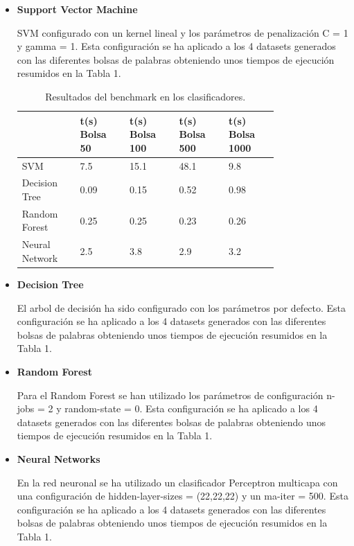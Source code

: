 \documentclass[11pt,a4paper]{article}
\begin{document}
\begin{itemize}
	\item \textbf{ Support Vector Machine }
    
    SVM configurado con un kernel lineal y los parámetros de penalización C = 1 y gamma = 1. Esta configuración se ha aplicado a los 4 datasets generados con las diferentes bolsas de palabras obteniendo unos tiempos de ejecución resumidos en la Tabla 1.
    
    \begin{table}[h]
      \label{tabla_benchmark}
      \caption{Resultados del benchmark en los clasificadores.}
      \centering
      \begin{tabular}{p{0.17\linewidth}p{0.15\linewidth}p{0.15\linewidth}p{0.15\linewidth}p{0.15\linewidth}}
      \hline
       & t(s) Bolsa 50 & t(s) Bolsa 100 & t(s) Bolsa 500 & t(s) Bolsa 1000\\
      \hline
      SVM & 7.5 & 15.1 & 48.1 & 9.8 \\
      Decision Tree & 0.09 & 0.15 & 0.52 & 0.98 \\
      Random Forest & 0.25 & 0.25 & 0.23 & 0.26 \\
      Neural Network & 2.5 & 3.8 & 2.9 & 3.2 \\
      \hline
      \end{tabular}
    \end{table}

	\item \textbf{ Decision Tree }
    
    El arbol de decisión ha sido configurado con los parámetros por defecto. Esta configuración se ha aplicado a los 4 datasets generados con las diferentes bolsas de palabras obteniendo unos tiempos de ejecución resumidos en la Tabla 1.
    
	\item \textbf{ Random Forest }
    
    Para el Random Forest se han utilizado los parámetros de configuración n-jobs = 2 y random-state = 0. Esta configuración se ha aplicado a los 4 datasets generados con las diferentes bolsas de palabras obteniendo unos tiempos de ejecución resumidos en la Tabla 1.

	\item \textbf{ Neural Networks }
    
    En la red neuronal se ha utilizado un clasificador Perceptron multicapa con una configuración de hidden-layer-sizes = (22,22,22) y un ma-iter = 500. Esta configuración se ha aplicado a los 4 datasets generados con las diferentes bolsas de palabras obteniendo unos tiempos de ejecución resumidos en la Tabla 1.    

\end{itemize}
\end{document}

